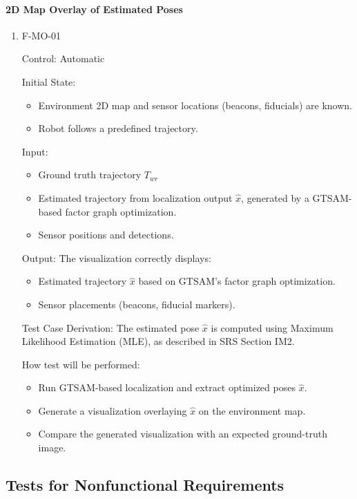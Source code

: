 \documentclass[12pt, titlepage]{article}
\begin{document}
\paragraph{2D Map Overlay of Estimated Poses}
\begin{enumerate}					
\item{F-MO-01\\}

Control: Automatic
					
Initial State: 
\begin{itemize}
  \item Environment 2D map and sensor locations (beacons, fiducials) are known.
  \item Robot follows a predefined trajectory.
\end{itemize}
					
Input: \begin{itemize}
  \item Ground truth trajectory $T_{wr}$
  \item Estimated trajectory from localization output $\hat{x}$, generated by a GTSAM-based factor graph optimization.
  \item Sensor positions and detections.
\end{itemize}

Output: The visualization correctly displays:
\begin{itemize}
    \item Estimated trajectory $\hat{x}$ based on GTSAM’s factor graph optimization.
    \item Sensor placements (beacons, fiducial markers).
\end{itemize}

Test Case Derivation: The estimated pose $\hat{x}$ is computed using Maximum Likelihood Estimation (MLE), as described in SRS Section IM2.

How test will be performed: 
\begin{itemize}
  \item Run GTSAM-based localization and extract optimized poses $\hat{x}$.
  \item Generate a visualization overlaying $\hat{x}$ on the environment map.
  \item Compare the generated visualization with an expected ground-truth image.
\end{itemize}

\end{enumerate}

\subsection{Tests for Nonfunctional Requirements}
\end{document}
